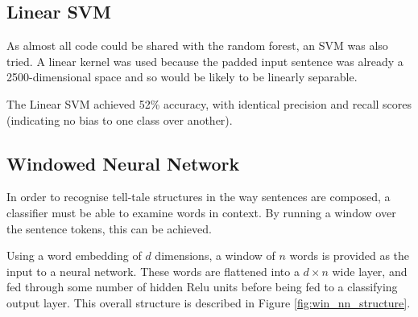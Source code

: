 \subsection{Linear SVM}
\label{sec:svm}

As almost all code could be shared with the random forest, an SVM was also
tried. A linear kernel was used because the padded input sentence was already a
2500-dimensional space and so would be likely to be linearly separable.

The Linear SVM achieved 52\% accuracy, with identical precision and recall
scores (indicating no bias to one class over another).

\subsection{Windowed Neural Network}
\label{sec:win_nn}
In order to recognise tell-tale structures in the way sentences are composed, a classifier must be able to examine words in context. By running a window over the sentence tokens, this can be achieved.

Using a word embedding of $d$ dimensions, a window of $n$ words is provided as the input to a neural network. These words are flattened into a $d \times n$ wide layer, and fed through some number of hidden Relu units before being fed to a classifying output layer. This overall structure is described in Figure \ref{fig:win_nn_structure}.

